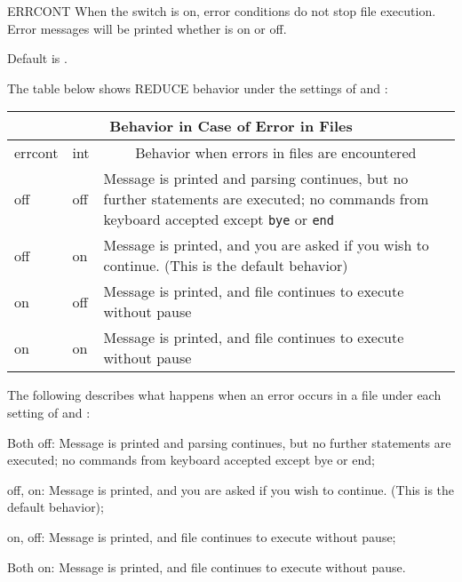 \begin{Switch}[errcont]{ERRCONT}
When the  switch is on, error conditions do not stop file
execution.  Error messages will be printed whether  is on or
off.

Default is .

\begin{Comments}
\begin{TEX}
The table below shows REDUCE behavior under the settings of  and
 :

  \begin{center}
  \begin{tabular}{|l|l|p{9.5cm}|}
\hline
\multicolumn{3}{|c|}{Behavior in Case of Error in Files}\\
\hline
\multicolumn{1}{|c|}{errcont} &
  \multicolumn{1}{c|}{int} &
    \multicolumn{1}{c|}{Behavior when errors in files are encountered}\\
\hline
off & off &
Message is printed and parsing continues, but no further statements are 
executed; no commands from keyboard accepted except \verb|bye| or
\verb|end| \\
off & on &
Message is printed, and you are asked if you wish to continue.  (This is the
default behavior) \\
on & off &
Message is printed, and file continues to execute without pause \\
on & on &
Message is printed, and file continues to execute without pause\\
\hline
  \end{tabular}
  \end{center}
\end{TEX}
\begin{INFO}
The following describes what happens when an error occurs in a file under
each setting of  and :

Both off:  Message is printed and parsing continues, but no further
statements are executed; no commands from keyboard accepted except bye or
end;

 off,  on:  Message is printed, and you are asked
if you wish to continue. (This is the default behavior);

 on,  off:  Message is printed, and file continues
to execute without pause;

Both on: Message is printed, and file continues to execute without pause.
\end{INFO}
\end{Comments}
\end{Switch}



